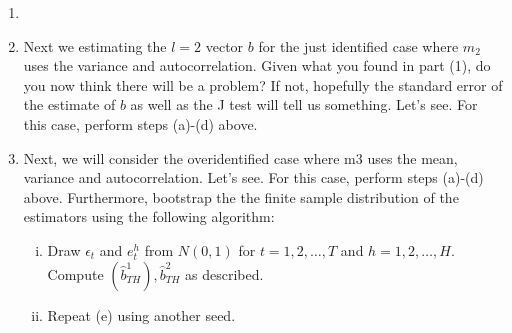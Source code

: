 \documentclass{article} %
\theoremstyle{definition}
\begin{document}
\begin{enumerate}
		\item 
		
		\item Next we estimating the $ l = 2 $ vector $ b $ for the just identified case where $ m_2 $ uses the variance and autocorrelation. Given what you found in part (1), do you now think there will be a problem? If not, hopefully the standard error of the estimate of $ b $ as well as the J test will tell us something. Let’s see. For this case, perform steps (a)-(d) above.
		
		\item Next, we will consider the overidentified case where m3 uses the mean, variance and autocorrelation. Let’s see. For this case, perform steps (a)-(d) above. Furthermore, bootstrap the the finite sample distribution of the estimators using the following algorithm:
		\begin{enumerate}[i.]
			\item Draw $ \epsilon_t $ and $ e_t^h $ from $ N(0,1) $ for $ t = 1,2,\hdots,T $ and $ h = 1,2,\hdots,H $. Compute $ (\hat{b}_{TH}^1), \hat{b}_{TH}^2 $ as described.
			
			\item Repeat (e) using another seed.
		\end{enumerate}
	
	\end{enumerate}
\end{document}
